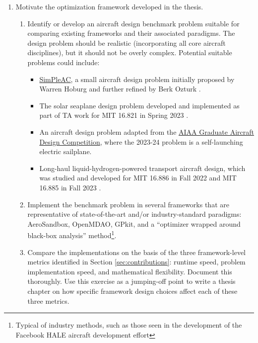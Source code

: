 \documentclass[12pt,vi,oneside]{report}
\begin{document}
    \begin{enumerate}
        \item Motivate the optimization framework developed in the thesis.
        \begin{enumerate}
            \item Identify or develop an aircraft design benchmark problem suitable for comparing existing frameworks and their associated paradigms. The design problem should be realistic (incorporating all core aircraft disciplines), but it should not be overly complex. Potential suitable problems could include:
            \begin{itemize}[noitemsep]
                \item \href{https://github.com/peterdsharpe/AeroSandbox/blob/master/tutorial/02%20-%20Design%20Optimization/03%20-%20Aircraft%20Design%20-%20SimPleAC.ipynb}{SimPleAC}, a small aircraft design problem initially proposed by Warren Hoburg \cite{hoburg_geometric_2014} and further refined by Berk Ozturk \cite{ozturk_conceptual_2018}.
                \item The solar seaplane design problem developed and implemented as part of TA work for MIT 16.821 in Spring 2023 \cite{solar_seaplane}.
                \item An aircraft design problem adapted from the \href{https://www.aiaa.org/get-involved/students-educators/Design-Competitions}{AIAA Graduate Aircraft Design Competition}, where the 2023-24 problem is a self-launching electric sailplane.
                \item Long-haul liquid-hydrogen-powered transport aircraft design, which was studied and developed for MIT 16.886 in Fall 2022 and MIT 16.885 in Fall 2023 \cite{gaubatz_estimating_2023, transport_aircraft}.
            \end{itemize}
            \item Implement the benchmark problem in several frameworks that are representative of state-of-the-art and/or industry-standard paradigms: AeroSandbox, OpenMDAO, GPkit, and a ``optimizer wrapped around black-box analysis'' method\footnote{Typical of industry methods, such as those seen in the development of the Facebook HALE aircraft development effort\cite{fbhale}}.
            \item Compare the implementations on the basis of the three framework-level metrics identified in Section \ref{sec:contributions}: runtime speed, problem implementation speed, and mathematical flexibility. Document this thoroughly. Use this exercise as a jumping-off point to write a thesis chapter on how specific framework design choices affect each of these three metrics.

\end{enumerate}
\end{enumerate}
\end{document}
